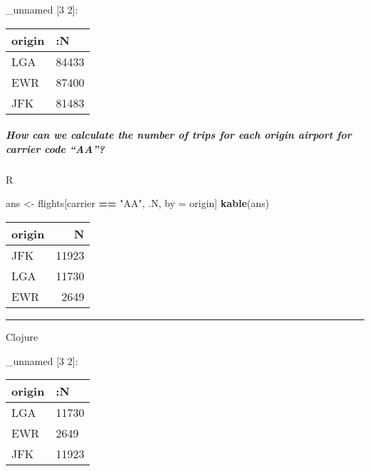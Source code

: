 \documentclass[]{article}
\newenvironment{Shaded}{\begin{snugshade}}{\end{snugshade}}
\newcommand{\AttributeTok}[1]{\textcolor[rgb]{0.77,0.63,0.00}{#1}}
\newcommand{\KeywordTok}[1]{\textcolor[rgb]{0.13,0.29,0.53}{\textbf{#1}}}
\newcommand{\NormalTok}[1]{#1}
\newcommand{\OperatorTok}[1]{\textcolor[rgb]{0.81,0.36,0.00}{\textbf{#1}}}
\newcommand{\StringTok}[1]{\textcolor[rgb]{0.31,0.60,0.02}{#1}}
\newcommand{\VariableTok}[1]{\textcolor[rgb]{0.00,0.00,0.00}{#1}}
\let\oldsubparagraph\subparagraph
\renewcommand{\subparagraph}[1]{\oldsubparagraph{#1}\mbox{}}
\begin{document}
\_unnamed {[}3 2{]}:

\begin{longtable}[]{@{}ll@{}}
\toprule
origin & :N\tabularnewline
\midrule
\endhead
LGA & 84433\tabularnewline
EWR & 87400\tabularnewline
JFK & 81483\tabularnewline
\bottomrule
\end{longtable}

\hypertarget{how-can-we-calculate-the-number-of-trips-for-each-origin-airport-for-carrier-code-aa}{%
\subparagraph{How can we calculate the number of trips for each origin
airport for carrier code
``AA''?}\label{how-can-we-calculate-the-number-of-trips-for-each-origin-airport-for-carrier-code-aa}}

R

\begin{Shaded}
\begin{Highlighting}[]
\NormalTok{ans <-}\StringTok{ }\NormalTok{flights[carrier }\OperatorTok{==}\StringTok{ "AA"}\NormalTok{, .N, by =}\StringTok{ }\NormalTok{origin]}
\KeywordTok{kable}\NormalTok{(ans)}
\end{Highlighting}
\end{Shaded}

\begin{longtable}[]{@{}lr@{}}
\toprule
origin & N\tabularnewline
\midrule
\endhead
JFK & 11923\tabularnewline
LGA & 11730\tabularnewline
EWR & 2649\tabularnewline
\bottomrule
\end{longtable}

\begin{center}\rule{0.5\linewidth}{0.5pt}\end{center}

Clojure

\begin{Shaded}
\end{Shaded}

\_unnamed {[}3 2{]}:

\begin{longtable}[]{@{}ll@{}}
\toprule
origin & :N\tabularnewline
\midrule
\endhead
LGA & 11730\tabularnewline
EWR & 2649\tabularnewline
JFK & 11923\tabularnewline
\bottomrule
\end{longtable}
\end{document}
